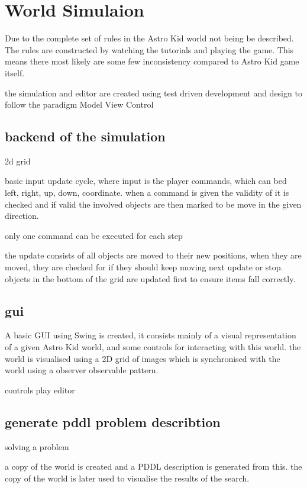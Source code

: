 \section{World Simulaion}
	Due to the complete set of rules in the Astro Kid world not being be described. The rules are constructed by watching the tutorials and playing the game. This means there most likely are some few inconsistency compared to Astro Kid game itself.



	the simulation and editor are created using test driven development and design to follow the paradigm Model View Control 

	\subsection{backend of the simulation}
	2d grid
	
	basic input update cycle, where input is the player commands, which can bed left, right, up, down, coordinate. when a command is given the validity of it is checked and if valid the involved objects are then marked to be move in the given direction. 
	
	only one command can be executed for each step
	
	the update consists of all objects are moved to their new positions, when they are moved, they are checked for if they should keep moving next update or stop. objects in the bottom of the grid are updated first to ensure items fall correctly.
	
	
	\subsection{gui}
	A basic GUI using Swing is created, it consists mainly of a visual representation of a given Astro Kid world, and some controls for interacting with this world. the world is visualised using a 2D grid of images which is synchronised with the world using a observer observable pattern.
	
	
	controls
		play
		editor
	
	\subsection{generate pddl problem describtion}
	
	
	solving a problem
	
	a copy of the world is created and a PDDL description is generated from this. the copy of the world is later used to visualise the results of the search.
	
